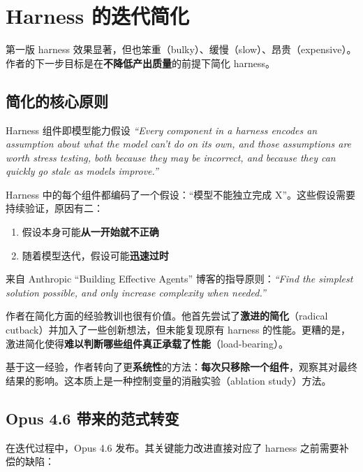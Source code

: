 \section{Harness 的迭代简化}

第一版 harness 效果显著，但也笨重（bulky）、缓慢（slow）、昂贵（expensive）。作者的下一步目标是在\textbf{不降低产出质量}的前提下简化 harness。

\subsection{简化的核心原则}

\begin{importantbox}{Harness 组件即模型能力假设}
\textit{``Every component in a harness encodes an assumption about what the model can't do on its own, and those assumptions are worth stress testing, both because they may be incorrect, and because they can quickly go stale as models improve.''}

Harness 中的每个组件都编码了一个假设：``模型不能独立完成 X''。这些假设需要持续验证，原因有二：
\begin{enumerate}[leftmargin=1.5em]
    \item 假设本身可能\textbf{从一开始就不正确}
    \item 随着模型迭代，假设可能\textbf{迅速过时}
\end{enumerate}

来自 Anthropic ``Building Effective Agents'' 博客的指导原则：\textit{``Find the simplest solution possible, and only increase complexity when needed.''}
\end{importantbox}

作者在简化方面的经验教训也很有价值。他首先尝试了\textbf{激进的简化}（radical cutback）并加入了一些创新想法，但未能复现原有 harness 的性能。更糟的是，激进简化使得\textbf{难以判断哪些组件真正承载了性能}（load-bearing）。

基于这一经验，作者转向了更\textbf{系统性}的方法：\textbf{每次只移除一个组件}，观察其对最终结果的影响。这本质上是一种控制变量的消融实验（ablation study）方法。

\subsection{Opus 4.6 带来的范式转变}

在迭代过程中，Opus 4.6 发布。其关键能力改进直接对应了 harness 之前需要补偿的缺陷：

